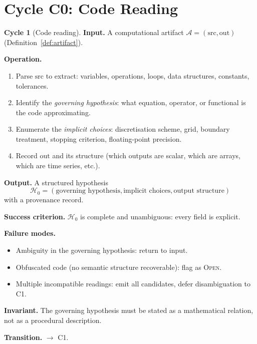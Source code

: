 \documentclass[11pt,a4paper]{article}
\theoremstyle{definition}
\newtheorem{cycle}{Cycle}[section]
\theoremstyle{plain}
\newcommand{\Hcal}{\mathcal{H}}
\newcommand{\Acal}{\mathcal{A}}
\newcommand{\STOPEN}{\textsc{Open}}
\begin{document}
\section{Cycle C0: Code Reading}
\label{sec:c0}

\begin{cycle}[Code reading]\label{cy:c0}
\textbf{Input.} A computational artifact $\Acal = (\mathrm{src},
\mathrm{out})$ (Definition~\ref{def:artifact}).

\medskip
\textbf{Operation.}
\begin{enumerate}[label=\arabic*.]
  \item Parse $\mathrm{src}$ to extract: variables, operations,
        loops, data structures, constants, tolerances.
  \item Identify the \emph{governing hypothesis}: what equation,
        operator, or functional is the code approximating.
  \item Enumerate the \emph{implicit choices}: discretisation
        scheme, grid, boundary treatment, stopping criterion,
        floating-point precision.
  \item Record $\mathrm{out}$ and its structure (which outputs are
        scalar, which are arrays, which are time series, etc.).
\end{enumerate}

\medskip
\textbf{Output.} A structured hypothesis
\[
  \Hcal_0 = (\text{governing hypothesis}, \text{implicit choices},
            \text{output structure})
\]
with a provenance record.

\medskip
\textbf{Success criterion.} $\Hcal_0$ is complete and unambiguous:
every field is explicit.

\medskip
\textbf{Failure modes.}
\begin{itemize}
  \item Ambiguity in the governing hypothesis: return to input.
  \item Obfuscated code (no semantic structure recoverable): flag
        as \STOPEN.
  \item Multiple incompatible readings: emit all candidates, defer
        disambiguation to C1.
\end{itemize}

\medskip
\textbf{Invariant.} The governing hypothesis must be stated as a
mathematical relation, not as a procedural description.

\medskip
\textbf{Transition.} $\to$ C1.
\end{cycle}
\end{document}
